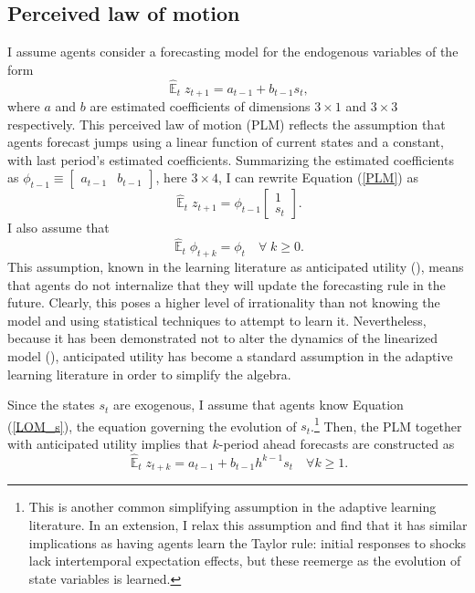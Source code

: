 \documentclass[11pt]{article}
\renewcommand{\[}{\begin{equation}}
\renewcommand{\]}{\end{equation}}
\DeclareMathOperator{\E}{\mathbb{E}}
\begin{document}
\subsection{Perceived law of motion}
I assume agents consider a forecasting model for the endogenous variables of the form
\begin{equation}
\hat{\E}_{t}z_{t+1} = a_{t-1} + b_{t-1} s_{t} \label{PLM},  
\end{equation}
where $a$ and $b$ are estimated coefficients of dimensions $3\times1$ and $3\times3$ respectively. This perceived law of motion (PLM) reflects the assumption that agents forecast jumps using a linear function of current states and a constant, with last period's estimated coefficients. Summarizing the estimated coefficients as $\phi_{t-1} \equiv \begin{bmatrix}a_{t-1} & b_{t-1}\end{bmatrix}$, here $3\times 4$, I can rewrite Equation (\ref{PLM}) as 
\begin{equation} 
\hat{\E}_t z_{t+1} = \phi_{t-1}\begin{bmatrix} 1 \\ s_{t} \end{bmatrix} \label{PLMcompact}.
\end{equation}
I also assume that 
\begin{equation}
\hat{\E}_{t}{\phi_{t+k}} = \phi_{t} \quad \forall \; k\geq0. 
\end{equation}
This assumption, known in the learning literature as anticipated utility (\cite{kreps1998anticipated}), means that agents do not internalize that they will update the forecasting rule in the future. Clearly, this poses a higher level of irrationality than not knowing the model and using statistical techniques to attempt to learn it. Nevertheless, because it has been demonstrated not to alter the dynamics of the linearized model (\cite{sargent1999}), anticipated utility has become a standard assumption in the adaptive learning literature in order to simplify the algebra.

Since the states $s_t$ are exogenous, I assume that agents know Equation (\ref{LOM_s}), the equation governing the evolution of $s_t$.\footnote{This is another common simplifying assumption in the adaptive learning literature. In an extension, I relax this assumption and find that it has similar implications as having agents learn the Taylor rule: initial responses to shocks lack intertemporal expectation effects, but these reemerge as the evolution of state variables is learned.} Then, the PLM together with anticipated utility implies that $k$-period ahead forecasts are constructed as
\begin{equation}
\hat{\E}_t z_{t+k} = a_{t-1} + b_{t-1}h^{k-1}s_t  \quad \forall k\geq 1 \label{PLM_fcst_general}.
\end{equation}
\end{document}

